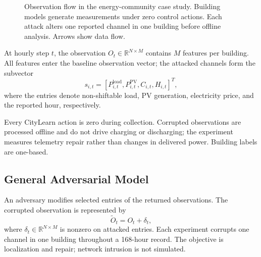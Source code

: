 \documentclass[conference]{IEEEtran}
\newcommand{\R}{\mathbb{R}}
\begin{document}
\begin{figure}[t]
\caption{Observation flow in the energy-community case study. Building models generate measurements under zero control actions. Each attack alters one reported channel in one building before offline analysis. Arrows show data flow.}
\label{fig:community}
\end{figure}

At hourly step $t$, the observation $O_t\in\R^{N\times M}$ contains $M$ features per building. All features enter the baseline observation vector; the attacked channels form the subvector
\begin{equation}
s_{i,t}=\left[P_{i,t}^{\mathrm{load}},P_{i,t}^{\mathrm{PV}},C_{i,t},H_{i,t}\right]^T,
\label{eq:observation}
\end{equation}
where the entries denote non-shiftable load, PV generation, electricity price, and the reported hour, respectively.

Every CityLearn action is zero during collection. Corrupted observations are processed offline and do not drive charging or discharging; the experiment measures telemetry repair rather than changes in delivered power. Building labels are one-based.

\subsection{General Adversarial Model}

An adversary modifies selected entries of the returned observations. The corrupted observation is represented by
\begin{equation}
\widetilde{O}_t=O_t+\delta_t,
\label{eq:corrupted}
\end{equation}
where $\delta_t\in\R^{N\times M}$ is nonzero on attacked entries. Each experiment corrupts one channel in one building throughout a 168-hour record. The objective is localization and repair; network intrusion is not simulated.
\end{document}

